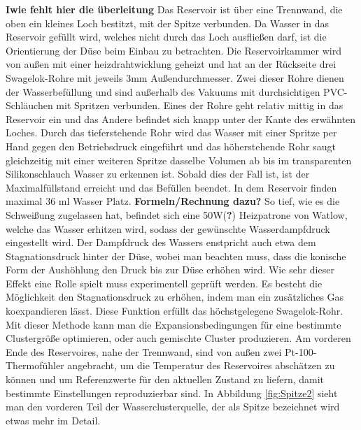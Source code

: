 \textbf{Iwie fehlt hier die überleitung} Das Reservoir ist über eine Trennwand, die oben ein kleines Loch bestitzt, mit der Spitze verbunden. Da Wasser in das Reservoir gefüllt wird, welches nicht durch das Loch ausfließen darf, ist die Orientierung der Düse beim Einbau zu betrachten. Die Reservoirkammer wird von außen mit einer heizdrahtwicklung geheizt und hat an der Rückseite drei Swagelok-Rohre mit jeweils 3mm Außendurchmesser. Zwei dieser Rohre dienen der Wasserbefüllung und sind außerhalb des Vakuums mit durchsichtigen PVC-Schläuchen mit Spritzen verbunden. Eines der Rohre geht relativ mittig in das Reservoir ein und das Andere befindet sich knapp unter der Kante des erwähnten Loches. Durch das tieferstehende Rohr wird das Wasser mit einer Spritze per Hand gegen den Betriebsdruck eingeführt und das höherstehende Rohr saugt gleichzeitig mit einer weiteren Spritze dasselbe Volumen ab bis im transparenten Silikonschlauch Wasser zu erkennen ist. Sobald dies der Fall ist, ist der Maximalfüllstand erreicht und das Befüllen beendet. In dem Reservoir finden maximal 36 ml Wasser Platz. \textbf{Formeln/Rechnung dazu?} So tief, wie es die Schweißung zugelassen hat, befindet sich eine 50W(\textbf{?}) Heizpatrone von Watlow, welche das Wasser erhitzen wird, sodass der gewünschte Wasserdampfdruck eingestellt wird. Der Dampfdruck des Wassers enstpricht auch etwa dem Stagnationsdruck hinter der Düse, wobei man beachten muss, dass die konische Form der Aushöhlung den Druck bis zur Düse erhöhen wird. Wie sehr dieser Effekt eine Rolle spielt muss experimentell geprüft werden. Es besteht die Möglichkeit den Stagnationsdruck zu erhöhen, indem man ein zusätzliches Gas koexpandieren lässt. Diese Funktion erfüllt das höchstgelegene Swagelok-Rohr. Mit dieser Methode kann man die Expansionsbedingungen für eine bestimmte Clustergröße optimieren, oder auch gemischte Cluster produzieren. Am vorderen Ende des Reservoires, nahe der Trennwand, sind von außen zwei Pt-100-Thermofühler angebracht, um die Temperatur des Reservoires abschätzen zu können und um Referenzwerte für den aktuellen Zustand zu liefern, damit bestimmte Einstellungen reproduzierbar sind. 
In Abbildung \ref{fig:Spitze2} sieht man den vorderen Teil der Wasserclusterquelle, der als Spitze bezeichnet wird etwas mehr im Detail.
